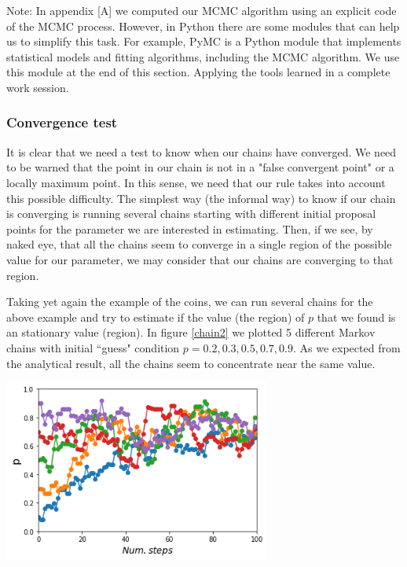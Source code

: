 \documentclass[onecolumn,           %
               showpacs,            %
               preprintnumbers,     %
               aps,                 %
               letterpaper,             %
               superscriptaddress,      %
               nofootinbib,         %
               tightenlines,        %
               floats,floatfix      %
               ,usenatbib,
               ]{revtex4-1}
\begin{document}
Note: In appendix [A] we computed our MCMC algorithm using an explicit code of the MCMC process. However, in Python there are some modules that can help us to simplify this task. For example, PyMC is a Python module that implements statistical models and fitting algorithms, including the MCMC algorithm. We use this module at the end of this section. Applying the tools learned in a complete work session.

\subsubsection{Convergence test} 
It is clear that we need a test to know when our chains have converged. We need to be warned that the point in our chain is not in a "false convergent point" or a locally maximum point. In this sense, we need that our rule takes into account this possible difficulty. The simplest way (the informal way) to know if our chain is converging is running several chains starting with different initial proposal points for the parameter we are interested in estimating. Then, if we see, by naked eye, that all the chains seem to converge in a single region of the possible value for our parameter, we may consider that our chains are converging to that region. 

 Taking yet again the example of the coins, we can run several chains for the above example and try to estimate if the value (the region) of $p$ that we found is an stationary value (region). In figure \ref{chain2} we plotted 5 different Markov chains with initial ``guess" condition $p=0.2,0.3,0.5,0.7,0.9$. As we expected from the analytical result, all the chains seem to concentrate near the same value.

\begin{minipage}{\textwidth}
\centering
\includegraphics[height=6cm]{Figures/chain22.png}
\label{chain2}
\end{minipage}
\end{document}
